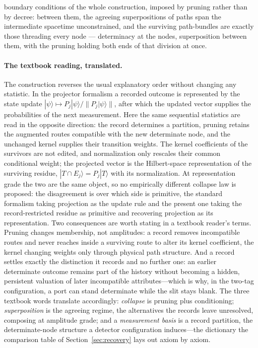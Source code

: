 boundary conditions of the whole construction, imposed by pruning rather than by decree: between them, the agreeing superpositions of paths span the intermediate spacetime unconstrained, and the surviving path-bundles are exactly those threading every node --- determinacy at the nodes, superposition between them, with the pruning holding both ends of that division at once.

\paragraph{The textbook reading, translated.} The construction reverses the usual explanatory order without changing any statistic. In the projector formalism a recorded outcome is represented by the state update $|\psi\rangle \mapsto P_j|\psi\rangle / \lVert P_j|\psi\rangle \rVert$, after which the updated vector supplies the probabilities of the next measurement. Here the same sequential statistics are read in the opposite direction: the record determines a partition, pruning retains the augmented routes compatible with the new determinate node, and the unchanged kernel supplies their transition weights. The kernel coefficients of the survivors are not edited, and normalization only rescales their common conditional weight; the projected vector is the Hilbert-space representation of the surviving residue, $|T \cap E_j\rangle = P_j|T\rangle$ with its normalization. At representation grade the two are the same object, so no empirically different collapse law is proposed: the disagreement is over which side is primitive, the standard formalism taking projection as the update rule and the present one taking the record-restricted residue as primitive and recovering projection as its representation. Two consequences are worth stating in a textbook reader's terms. Pruning changes membership, not amplitudes: a record removes incompatible routes and never reaches inside a surviving route to alter its kernel coefficient, the kernel changing weights only through physical path structure. And a record settles exactly the distinction it records and no further one: an earlier determinate outcome remains part of the history without becoming a hidden, persistent valuation of later incompatible attributes---which is why, in the two-tag configuration, a port can stand determinate while the slit stays blank. The three textbook words translate accordingly: \emph{collapse} is pruning plus conditioning; \emph{superposition} is the agreeing regime, the alternatives the records leave unresolved, composing at amplitude grade; and a \emph{measurement basis} is a record partition, the determinate-node structure a detector configuration induces---the dictionary the comparison table of Section~\ref{sec:recovery} lays out axiom by axiom.

